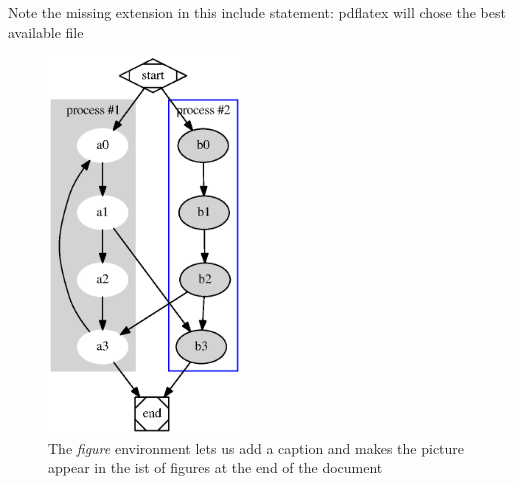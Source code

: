 Note the missing extension in this include statement: pdflatex will chose the best available file
\begin{figure}[H]
\includegraphics[height=10cm]{graph01/cluster}
\caption[Figure environment]{The {\it figure} environment lets us add a caption and makes the picture appear in the ist of figures at the end of the document} 
\end{figure}
